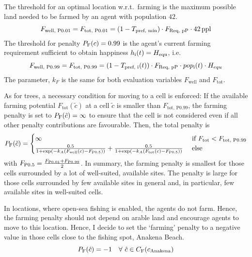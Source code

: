 The threshold for an optimal location w.r.t.\ farming is the maximum possible land needed to be farmed by an agent with population $42$.
\begin{equation}
F_\text{well, P0.01} = F_\text{tot, P0.01} =  (1-T_\text{pref, min})\cdot F_\text{Req, pP} \cdot 42\, {\rm ppl} 
\end{equation}
The threshold for penalty $P_{\rm F}(c)=0.99$ is the agent's current farming requirement sufficient to obtain happiness $h_{\rm i}(t) = H_{\rm equ}$, i.e.\
\begin{equation} 
F_\text{well, P0.99} = F_\text{tot, P0.99} = (1-T_\text{pref, i}(t))\cdot F_\text{Req, pP}\cdot pop_{\rm i}(t) \cdot H_{equ}
\end{equation}
The parameter, $k_F$ is the same for both evaluation variables $F_\text{well} $ and $F_\text{tot}$.

As for trees, a necessary condition for moving to a cell is enforced:
 If the available farming potential $F_\text{tot}(\tilde{c})$  at a cell $\tilde{c}$ is smaller than $F_\text{tot, P0.99}$, the farming penalty is set to $P_{\rm F}(\tilde{c}) = \infty$ to ensure that the cell is not considered even if all other penalty contributions are favourable.
Then, the total penalty is 
\begin{equation}
P_{\rm F} (\tilde{c}) = 
\begin{cases} 
\infty & \text{ if } F_\text{tot} < F_\text{tot, P0.99}\\
\frac{0.5}{1+\exp\left( - k_A (F_\text{well}(c)-F_\text{P0.5}) \right)} + \frac{0.5}{1+\exp\left( - k_A (F_\text{tot}(c)-F_\text{P0.5}) \right)} & \text{ else}
\end{cases}
\end{equation}
with $F_\text{P0.5} = \frac{F_{\rm P0.01}+F_{\rm P0.99}}{2}$.
In summary, the farming penalty is smallest for those cells surrounded by a lot of well-suited, available sites.
The penalty is large for those cells surrounded by few available sites in general and, in particular, few available sites in well-suited cells.

In locations, where open-sea fishing is enabled, the agents do not farm. 
Hence, the farming penalty should not depend on arable land and encourage agents to move to this location.
Hence, I decide to set the `farming' penalty to a negative value in those cells close to the fishing spot, Anakena Beach.
\begin{equation}
	P_{\rm F}(\hat{c}) = - 1 %
	 \quad \forall \  \hat{c} \in C_\text{F}(c_{\rm Anakena})
\end{equation}

